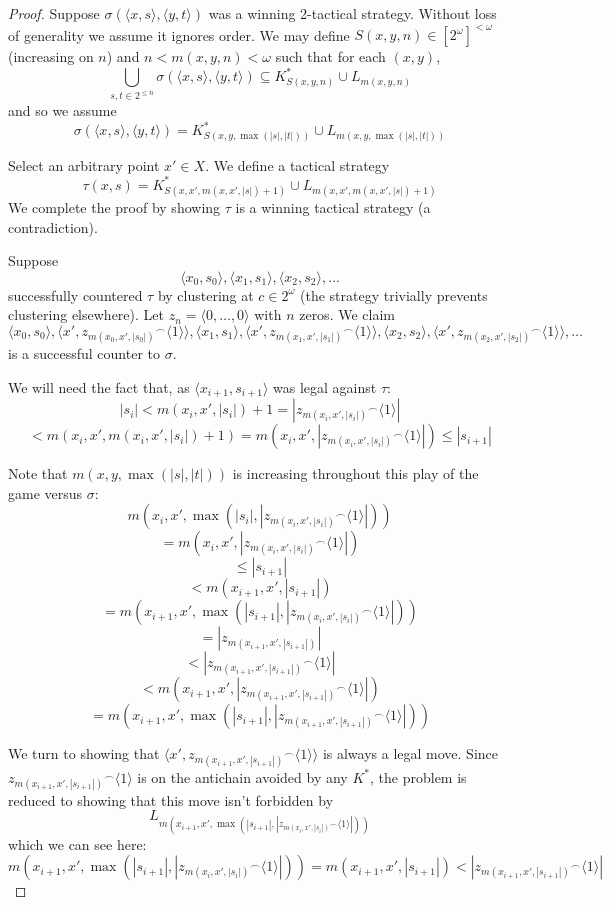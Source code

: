 \documentclass[11pt]{article}
\theoremstyle{plain}
\theoremstyle{definition}
\theoremstyle{remark}
\newcommand{\<}{\langle}
\renewcommand{\>}{\rangle}
\begin{document}
\begin{proof}
Suppose $\sigma(\<x,s\>,\<y,t\>)$ was a winning 2-tactical strategy. Without loss of generality we assume it ignores order. We may define $S(x,y,n)\in [2^\omega]^{<\omega}$ (increasing on $n$) and $n<m(x,y,n)<\omega$ such that for each $(x,y)$,
  \[
    \bigcup_{s,t \in 2^{\leq n}} \sigma(\<x,s\>,\<y,t\>) \subseteq 
    K^*_{S(x,y,n)} \cup L_{m(x,y,n)}
  \]
and so we assume
  \[
    \sigma(\<x,s\>,\<y,t\>) =
    K^*_{S(x,y,\max(|s|,|t|))} \cup L_{m(x,y,\max(|s|,|t|))}
  \]

Select an arbitrary point $x' \in X$. We define a tactical strategy 
  \[
  \tau(x,s) = 
  K^*_{S(x,x',m(x,x',|s|)+1)} \cup L_{m(x,x',m(x,x',|s|)+1)}
  \]
We complete the proof by showing $\tau$ is a winning tactical strategy (a contradiction).

Suppose
\[
\<x_0, s_0\>, \<x_1, s_1\>, \<x_2, s_2\>, \dots
\]
successfully countered $\tau$ by clustering at $c\in 2^\omega$ (the strategy trivially prevents clustering elsewhere). Let $z_n = \<0,\dots,0\>$ with $n$ zeros. We claim
\[
\<x_0, s_0\>, \<x', {z_{m(x_0,x',|s_0|)}}^\frown\<1\>\>, \<x_1, s_1\>, \<x', {z_{m(x_1,x',|s_1|)}}^\frown\<1\>\>,  \<x_2, s_2\>, \<x', {z_{m(x_2,x',|s_2|)}}^\frown\<1\>\>, \dots
\]
is a successful counter to $\sigma$.

We will need the fact that, as $\<x_{i+1},s_{i+1}\>$ was legal against $\tau$:
  \[
    |s_i| <
    m(x_i,x',|s_i|)+1 =
    |{z_{m(x_i,x',|s_i|)}}^\frown\<1\>| 
  \]
  \[
    <
    m(x_i,x',m(x_i,x',|s_i|)+1) =
    m(x_i,x',|{z_{m(x_i,x',|s_i|)}}^\frown\<1\>|) \leq
    |s_{i+1}|
  \]

Note that $m(x,y,\max(|s|,|t|))$ is increasing throughout this play of the game versus $\sigma$:
  \[
    m(x_i,x',\max(|s_i|,|{z_{m(x_i,x',|s_i|)}}^\frown\<1\>|))
  \]
  \[
    =
    m(x_i,x',|{z_{m(x_i,x',|s_i|)}}^\frown\<1\>|)
  \]
  \[
    \leq
    |s_{i+1}| 
  \]
  \[
    <
    m(x_{i+1},x',|s_{i+1}|)
  \]
  \[
    =
    m(x_{i+1},x',\max(|s_{i+1}|,|{z_{m(x_i,x',|s_i|)}}^\frown\<1\>|))
  \]
  \[
    =
    |{z_{m(x_{i+1},x',|s_{i+1}|)}}|
  \]
  \[
    <
    |{z_{m(x_{i+1},x',|s_{i+1}|)}}^\frown\<1\>|
  \]
  \[
    <
    m(x_{i+1},x',|{z_{m(x_{i+1},x',|s_{i+1}|)}}^\frown\<1\>|)
  \]
  \[
    =
    m(x_{i+1},x',\max(|s_{i+1}|,|{z_{m(x_{i+1},x',|s_{i+1}|)}}^\frown\<1\>|))
  \]

We turn to showing that $\<x', {z_{m(x_{i+1},x',|s_{i+1}|)}}^\frown\<1\>\>$ is always a legal move. Since ${z_{m(x_{i+1},x',|s_{i+1}|)}}^\frown\<1\>$ is on the antichain avoided by any $K^*$, the problem is reduced to showing that this move isn't forbidden by
  \[
  L_{m(x_{i+1},x',\max(|s_{i+1}|,|{z_{m(x_i,x',|s_i|)}}^\frown\<1\>|))}
  \]
which we can see here:
  \[
    m(x_{i+1},x',\max(|s_{i+1}|,|{z_{m(x_i,x',|s_i|)}}^\frown\<1\>|)) =
    m(x_{i+1},x',|s_{i+1}|) <
    |{z_{m(x_{i+1},x',|s_{i+1}|)}}^\frown\<1\>|
  \]


\end{proof}
\end{document}
